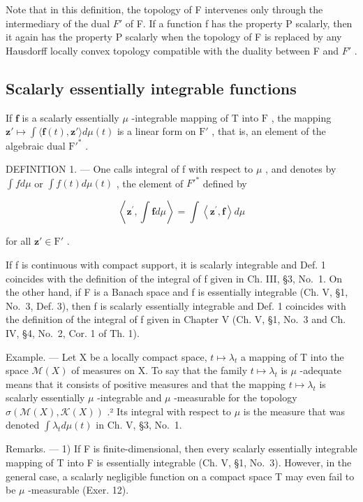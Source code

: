 Note that in this definition, the topology of F intervenes only through the intermediary of the dual \(F'\) of F. If a function f has the property P scalarly, then it again has the property P scalarly when the topology of F is replaced by any Hausdorff locally convex topology compatible with the duality between F and \(F'\) .

\subsection{Scalarly essentially integrable functions}

If \(\mathbf{f}\) is a scalarly essentially \(\mu\) -integrable mapping of \(\mathrm{T}\) into \(\mathrm{F}\) , the mapping \(\mathbf{z}' \mapsto \int \langle \mathbf{f}(t), \mathbf{z}' \rangle d\mu(t)\) is a linear form on \(\mathrm{F}'\) , that is, an element of the algebraic dual \(\mathrm{F}'^*\) .

DEFINITION 1. --- One calls integral of f with respect to \(\mu\) , and denotes by \(\int f d\mu\) or \(\int f(t) d\mu(t)\) , the element of \(F'^{*}\) defined by

\[
\left\langle \mathbf {z} ^ {\prime}, \int \mathbf {f} d \mu \right\rangle = \int \left\langle \mathbf {z} ^ {\prime}, \mathbf {f} \right\rangle d \mu
\]

for all \(\mathbf{z}' \in \mathrm{F}'\) .

If f is continuous with compact support, it is scalarly integrable and Def. 1 coincides with the definition of the integral of f given in Ch. III, §3, No.~1. On the other hand, if F is a Banach space and f is essentially integrable (Ch. V, §1, No.~3, Def. 3), then f is scalarly essentially integrable and Def. 1 coincides with the definition of the integral of f given in Chapter V (Ch. V, §1, No.~3 and Ch. IV, §4, No.~2, Cor. 1 of Th. 1).

Example. --- Let X be a locally compact space, \(t \mapsto \lambda_{t}\) a mapping of T into the space \(\mathcal{M}(X)\) of measures on X. To say that the family \(t \mapsto \lambda_{t}\) is \(\mu\) -adequate means that it consists of positive measures and that the mapping \(t \mapsto \lambda_{t}\) is scalarly essentially \(\mu\) -integrable and \(\mu\) -measurable for the topology \(\sigma(\mathcal{M}(X), \mathcal{K}(X))\) .² Its integral with respect to \(\mu\) is the measure that was denoted \(\int \lambda_t d\mu(t)\) in Ch. V, §3, No.~1.

Remarks. --- 1) If F is finite-dimensional, then every scalarly essentially integrable mapping of T into F is essentially integrable (Ch. V, §1, No.~3). However, in the general case, a scalarly negligible function on a compact space T may even fail to be \(\mu\) -measurable (Exer. 12).

